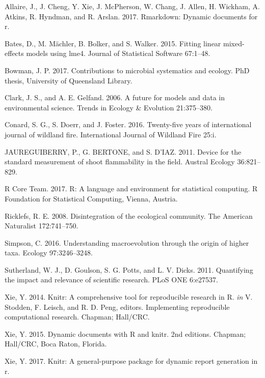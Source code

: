 \documentclass[11pt,a4paper]{article}
\begin{document}
\hypertarget{refs}{}
\hypertarget{ref-Allaire_2017}{}
Allaire, J., J. Cheng, Y. Xie, J. McPherson, W. Chang, J. Allen, H.
Wickham, A. Atkins, R. Hyndman, and R. Arslan. 2017. Rmarkdown: Dynamic
documents for r.

\hypertarget{ref-Bates_2015}{}
Bates, D., M. Mächler, B. Bolker, and S. Walker. 2015. Fitting linear
mixed-effects models using lme4. Journal of Statistical Software
67:1--48.

\hypertarget{ref-Bowman}{}
Bowman, J. P. 2017. Contributions to microbial systematics and ecology.
PhD thesis, University of Queensland Library.

\hypertarget{ref-Clark_2006}{}
Clark, J. S., and A. E. Gelfand. 2006. A future for models and data in
environmental science. Trends in Ecology \& Evolution 21:375--380.

\hypertarget{ref-Conard_2016}{}
Conard, S. G., S. Doerr, and J. Foster. 2016. Twenty-five years of
international journal of wildland fire. International Journal of
Wildland Fire 25:i.

\hypertarget{ref-JAUREGUIBERRY_2011}{}
JAUREGUIBERRY, P., G. BERTONE, and S. D\a'IAZ. 2011. Device for the
standard measurement of shoot flammability in the field. Austral Ecology
36:821--829.

\hypertarget{ref-R_Core_Team_2017}{}
R Core Team. 2017. R: A language and environment for statistical
computing. R Foundation for Statistical Computing, Vienna, Austria.

\hypertarget{ref-Ricklefs_2008}{}
Ricklefs, R. E. 2008. Disintegration of the ecological community. The
American Naturalist 172:741--750.

\hypertarget{ref-Simpson_2016}{}
Simpson, C. 2016. Understanding macroevolution through the origin of
higher taxa. Ecology 97:3246--3248.

\hypertarget{ref-Sutherland2011}{}
Sutherland, W. J., D. Goulson, S. G. Potts, and L. V. Dicks. 2011.
Quantifying the impact and relevance of scientific research. PLoS ONE
6:e27537.

\hypertarget{ref-Xie_2014}{}
Xie, Y. 2014. Knitr: A comprehensive tool for reproducible research in
R. \emph{in} V. Stodden, F. Leisch, and R. D. Peng, editors.
Implementing reproducible computational research. Chapman; Hall/CRC.

\hypertarget{ref-Xie_2015}{}
Xie, Y. 2015. Dynamic documents with R and knitr. 2nd editions. Chapman;
Hall/CRC, Boca Raton, Florida.

\hypertarget{ref-Xie_2017}{}
Xie, Y. 2017. Knitr: A general-purpose package for dynamic report
generation in r.
\end{document}
